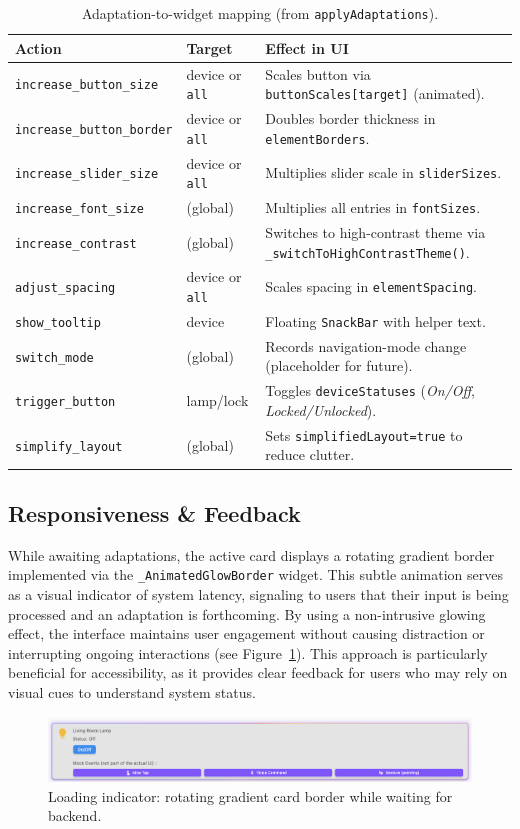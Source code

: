 \documentclass[openany]{book}
\begin{document}
\begin{table}[H]
\centering
\caption{Adaptation-to-widget mapping (from \texttt{applyAdaptations}).}
\begin{tabular}{llp{7.8cm}}
\toprule
\textbf{Action} & \textbf{Target} & \textbf{Effect in UI} \\
\midrule
\texttt{increase\_button\_size} & device or \texttt{all} & Scales button via \texttt{buttonScales[target]} (animated). \\
\texttt{increase\_button\_border} & device or \texttt{all} & Doubles border thickness in \texttt{elementBorders}. \\
\texttt{increase\_slider\_size} & device or \texttt{all} & Multiplies slider scale in \texttt{sliderSizes}. \\
\texttt{increase\_font\_size} & (global) & Multiplies all entries in \texttt{fontSizes}. \\
\texttt{increase\_contrast} & (global) & Switches to high-contrast theme via \texttt{\_switchToHighContrastTheme()}. \\
\texttt{adjust\_spacing} & device or \texttt{all} & Scales spacing in \texttt{elementSpacing}. \\
\texttt{show\_tooltip} & device & Floating \texttt{SnackBar} with helper text. \\
\texttt{switch\_mode} & (global) & Records navigation-mode change (placeholder for future). \\
\texttt{trigger\_button} & lamp/lock & Toggles \texttt{deviceStatuses} (\emph{On/Off}, \emph{Locked/Unlocked}). \\
\texttt{simplify\_layout} & (global) & Sets \texttt{simplifiedLayout=true} to reduce clutter. \\
\bottomrule
\end{tabular}
\label{tab:frontend-adapt-mapping}
\end{table}

\subsection{Responsiveness \& Feedback}
While awaiting adaptations, the active card displays a rotating gradient border implemented via the \texttt{\_AnimatedGlowBorder} widget. This subtle animation serves as a visual indicator of system latency, signaling to users that their input is being processed and an adaptation is forthcoming. By using a non-intrusive glowing effect, the interface maintains user engagement without causing distraction or interrupting ongoing interactions (see Figure~\ref{fig:glow}). This approach is particularly beneficial for accessibility, as it provides clear feedback for users who may rely on visual cues to understand system status.
\begin{figure}[H]
\centering
\includegraphics[width=1\linewidth]{images/fig_glow_border.png}
\caption{Loading indicator: rotating gradient card border while waiting for backend.}
\label{fig:glow}
\end{figure}
\end{document}
